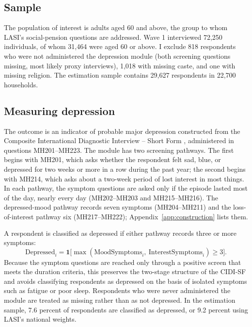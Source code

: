 \documentclass[11pt]{article}
\begin{document}
\subsection{Sample}

The population of interest is adults aged 60 and above, the group to whom
LASI's social-pension questions are addressed. Wave 1 interviewed 72,250
individuals, of whom 31,464 were aged 60 or above. I exclude 818 respondents who
were not administered the depression module (both screening questions missing,
most likely proxy interviews), 1,018 with missing caste, and one with missing
religion. The estimation sample contains 29,627 respondents in 22,700
households.

\subsection{Measuring depression}

The outcome is an indicator of probable major depression constructed from the
Composite International Diagnostic Interview -- Short Form
\citep[CIDI-SF;][]{Kessler1998}, administered in questions MH201--MH223. The
module has two screening pathways. The first begins with MH201, which asks
whether the respondent felt sad, blue, or depressed for two weeks or more in a
row during the past year; the second begins with MH214, which asks about a
two-week period of lost interest in most things. In each pathway, the symptom
questions are asked only if the episode lasted most of the day, nearly every
day (MH202--MH203 and MH215--MH216). The depressed-mood pathway records seven
symptoms (MH204--MH211) and the loss-of-interest pathway six (MH217--MH222);
Appendix~\ref{app:construction} lists them.

A respondent is classified as depressed if either pathway records three or
more symptoms:
\begin{equation*}
  \text{Depressed}_i = \mathbf{1}\big[\max(\text{MoodSymptoms}_i,\ \text{InterestSymptoms}_i) \geq 3\big].
\end{equation*}
Because the symptom questions are reached only through a positive screen that
meets the duration criteria, this preserves the two-stage structure of the
CIDI-SF and avoids classifying respondents as depressed on the basis of
isolated symptoms such as fatigue or poor sleep. Respondents who were never
administered the module are treated as missing rather than as not depressed.
In the estimation sample, 7.6 percent of respondents are classified as
depressed, or 9.2 percent using LASI's national weights.
\end{document}
